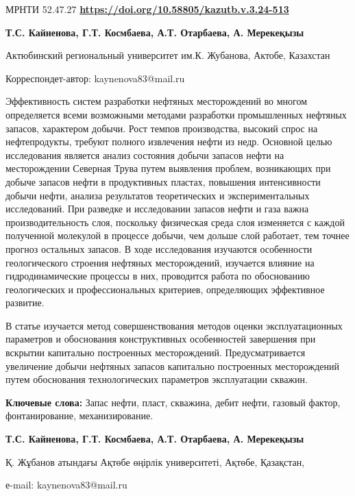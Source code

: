 \newpage
МРНТИ 52.47.27
\hfill {\bfseries \href{https://doi.org/10.58805/kazutb.v.3.24-513}{https://doi.org/10.58805/kazutb.v.3.24-513}}


\begin{center}
{\bfseries Т.С. Кайненова\envelope, Г.Т. Космбаева, А.Т. Отарбаева, А.
Мерекеқызы}

Актюбинский региональный университет им.К. Жубанова, Актобе, Казахстан
\end{center}
\envelope Корреспондет-автор: kaynenova83@mail.ru

Эффективность систем разработки нефтяных месторождений во многом
определяется всеми возможными методами разработки промышленных нефтяных
запасов, характером добычи. Рост темпов производства, высокий спрос на
нефтепродукты, требуют полного извлечения нефти из недр. Основной целью
исследования является анализ состояния добычи запасов нефти на
месторождении Северная Трува путем выявления проблем, возникающих при
добыче запасов нефти в продуктивных пластах, повышения интенсивности
добычи нефти, анализа результатов теоретических и экспериментальных
исследований. При разведке и исследовании запасов нефти и газа важна
производительность слоя, поскольку физическая среда слоя изменяется с
каждой полученной молекулой в процессе добычи, чем дольше слой работает,
тем точнее прогноз остальных запасов. В ходе исследования изучаются
особенности геологического строения нефтяных месторождений, изучается
влияние на гидродинамические процессы в них, проводится работа по
обоснованию геологических и профессиональных критериев, определяющих
эффективное развитие.

В статье изучается метод совершенствования методов оценки
эксплуатационных параметров и обоснования конструктивных особенностей
завершения при вскрытии капитально построенных месторождений.
Предусматривается увеличение добычи нефтяных запасов капитально
построенных месторождений путем обоснования технологических параметров
эксплуатации скважин.

{\bfseries Ключевые слова:} Запас нефти, пласт, скважина, дебит нефти, газовый
фактор, фонтанирование, механизирование.


\begin{center}
{\bfseries Т.С. Кайненова\envelope, Г.Т. Космбаева, А.Т.
Отарбаева, А. Мерекеқызы}

Қ. Жұбанов атындағы Ақтөбе өңірлік университеті, Ақтөбе, Қазақстан,

е-mail: kaynenova83@mail.ru
\end{center}

